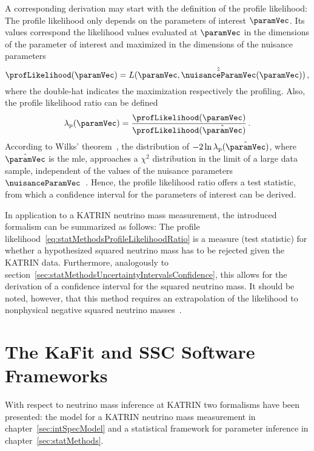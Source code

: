 A corresponding derivation may start with the definition of the profile likelihood: The profile likelihood only depends on the parameters of interest $\paramVec$. Its values correspond the likelihood values evaluated at $\paramVec$ in the dimensions of the parameter of interest and maximized in the dimensions of the nuisance parameters~\cite{ReviewOfParticlePhysics}
\begin{equation}
	\profLikelihood(\paramVec) = 
	L(\paramVec, \hat{\hat{\nuisanceParamVec}}(\paramVec))
	\comma
\end{equation}
where the double-hat indicates the maximization respectively the profiling. Also, the profile likelihood ratio can be defined~\cite{ReviewOfParticlePhysics}
\begin{equation}
	\label{eq:statMethodsProfileLikelihoodRatio}
	\lambda_\mathrm{p}(\paramVec) = 
	\frac{\profLikelihood(\paramVec)}{\profLikelihood(\hat{\paramVec})}
	\fullstop
\end{equation}
According to Wilks’ theorem~\cite{wilks1938}, the distribution of $-2\ln\lambda_\mathrm{p}(\hat{\paramVec})$, where $\hat{\paramVec}$ is the \gls{mle}, approaches a $\chi^2$ distribution in the limit of a large data sample, independent of the values of the nuisance parameters $\nuisanceParamVec$~\cite{ReviewOfParticlePhysics}. Hence, the profile likelihood ratio offers a test statistic, from which a confidence interval for the parameters of interest can be derived.

In application to a KATRIN neutrino mass measurement, the introduced formalism can be summarized as follows: The profile likelihood~\eqref{eq:statMethodsProfileLikelihoodRatio} is a measure (test statistic) for whether a hypothesized squared neutrino mass has to be rejected given the KATRIN data. Furthermore, analogously to section~\ref{sec:statMethodsUncertaintyIntervalsConfidence}, this allows for the derivation of a confidence interval for the squared neutrino mass. It should be noted, however, that this method requires an extrapolation of the likelihood to nonphysical negative squared neutrino masses~\cite{Kleesiek2014}.

\section{The KaFit and SSC Software Frameworks}
\label{sec:statMethodsKaFitSSC}
With respect to neutrino mass inference at KATRIN two formalisms have been presented: the model for a KATRIN neutrino mass measurement in chapter~\ref{sec:intSpecModel} and a statistical framework for parameter inference in chapter~\ref{sec:statMethods}. 

